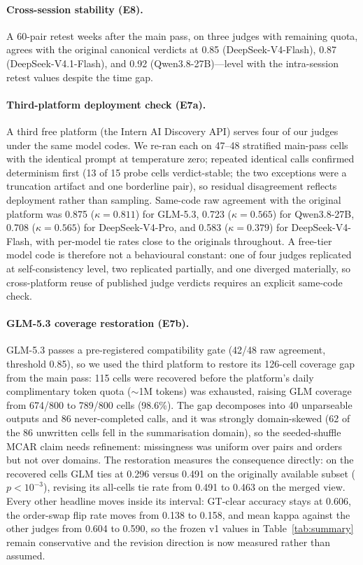 \documentclass[review,12pt]{elsarticle}
\begin{document}
\paragraph{Cross-session stability (E8).}
A 60-pair retest weeks after the main pass, on three judges with
remaining quota, agrees with the original canonical verdicts at 0.85
(DeepSeek-V4-Flash), 0.87 (DeepSeek-V4.1-Flash), and 0.92
(Qwen3.8-27B)---level with the intra-session retest values despite the
time gap.

\paragraph{Third-platform deployment check (E7a).}
A third free platform (the Intern AI Discovery API) serves four of our
judges under the same model codes. We re-ran each on 47--48 stratified
main-pass cells with the identical prompt at temperature zero; repeated
identical calls confirmed determinism first (13 of 15 probe cells
verdict-stable; the two exceptions were a truncation artifact and one
borderline pair), so residual disagreement reflects deployment rather
than sampling. Same-code raw agreement with the original platform was
0.875 ($\kappa=0.811$) for GLM-5.3, 0.723 ($\kappa=0.565$) for
Qwen3.8-27B, 0.708 ($\kappa=0.565$) for DeepSeek-V4-Pro, and 0.583
($\kappa=0.379$) for DeepSeek-V4-Flash, with per-model tie rates close
to the originals throughout. A free-tier model code is therefore not a
behavioural constant: one of four judges replicated at self-consistency
level, two replicated partially, and one diverged materially, so
cross-platform reuse of published judge verdicts requires an explicit
same-code check.

\paragraph{GLM-5.3 coverage restoration (E7b).}
GLM-5.3 passes a pre-registered compatibility gate (42/48 raw agreement,
threshold 0.85), so we used the third platform to restore its 126-cell
coverage gap from the main pass: 115 cells were recovered before the
platform's daily complimentary token quota ($\sim$1M tokens) was
exhausted, raising GLM coverage from 674/800 to 789/800 cells (98.6\%).
The gap decomposes into 40 unparseable outputs and 86 never-completed
calls, and it was strongly domain-skewed (62 of the 86 unwritten cells
fell in the summarisation domain), so the seeded-shuffle MCAR claim
needs refinement: missingness was uniform over pairs and orders but not
over domains. The restoration measures the consequence directly: on the
recovered cells GLM ties at 0.296 versus 0.491 on the originally
available subset ($p<10^{-3}$), revising its all-cells tie rate from
0.491 to 0.463 on the merged view. Every other headline moves inside its
interval: GT-clear accuracy stays at 0.606, the order-swap flip rate
moves from 0.138 to 0.158, and mean kappa against the other judges from
0.604 to 0.590, so the frozen v1 values in Table~\ref{tab:summary}
remain conservative and the revision direction is now measured rather
than assumed.
\end{document}
